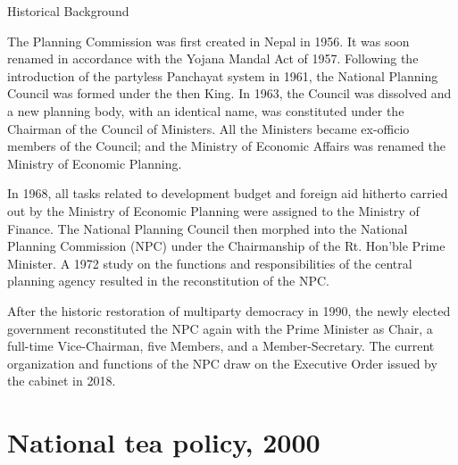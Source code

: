 \documentclass[
  openany]{book}
\begin{document}
Historical Background

The Planning Commission was first created in Nepal in 1956. It was soon renamed in accordance with the Yojana Mandal Act of 1957. Following the introduction of the partyless Panchayat system in 1961, the National Planning Council was formed under the then King. In 1963, the Council was dissolved and a new planning body, with an identical name, was constituted under the Chairman of the Council of Ministers. All the Ministers became ex-officio members of the Council; and the Ministry of Economic Affairs was renamed the Ministry of Economic Planning.

In 1968, all tasks related to development budget and foreign aid hitherto carried out by the Ministry of Economic Planning were assigned to the Ministry of Finance. The National Planning Council then morphed into the National Planning Commission (NPC) under the Chairmanship of the Rt. Hon'ble Prime Minister. A 1972 study on the functions and responsibilities of the central planning agency resulted in the reconstitution of the NPC.

After the historic restoration of multiparty democracy in 1990, the newly elected government reconstituted the NPC again with the Prime Minister as Chair, a full-time Vice-Chairman, five Members, and a Member-Secretary. The current organization and functions of the NPC draw on the Executive Order issued by the cabinet in 2018.

\hypertarget{national-tea-policy-2000}{%
\section{National tea policy, 2000}\label{national-tea-policy-2000}}
\end{document}

